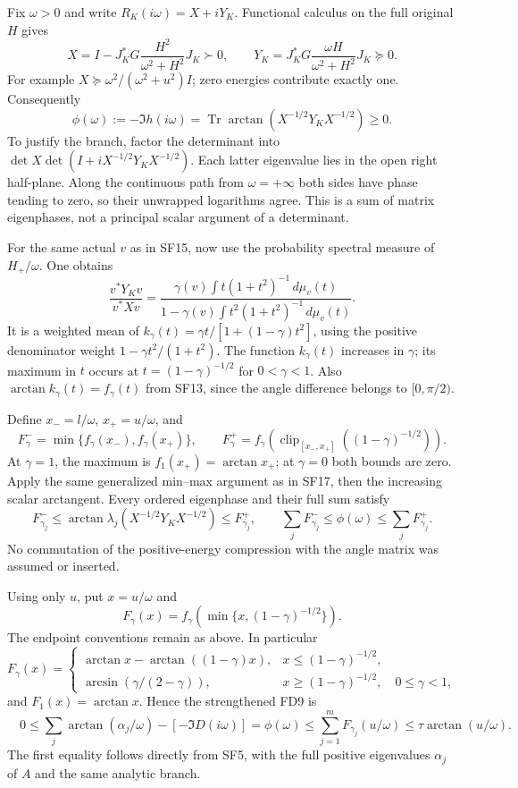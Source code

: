 \documentclass[10pt]{article}
\begin{document}
Fix \(\omega>0\) and write \(R_K(i\omega)=X+iY_K\). Functional calculus on the full original \(H\) gives \[
 X=I-J_K^*G\frac{H^2}{\omega^2+H^2}J_K\succ0,\qquad
 Y_K=J_K^*G\frac{\omega H}{\omega^2+H^2}J_K\succeq0 .
 \tag{SF19}
\] For example \(X\succeq\omega^2/(\omega^2+u^2)I\); zero energies contribute exactly one. Consequently \[
 \phi(\omega):=-\Im h(i\omega)
 =\operatorname{Tr}\arctan(X^{-1/2}Y_KX^{-1/2})\ge0 .
 \tag{SF20}
\] To justify the branch, factor the determinant into \(\det X\det(I+iX^{-1/2}Y_KX^{-1/2})\). Each latter eigenvalue lies in the open right half-plane. Along the continuous path from \(\omega=+\infty\) both sides have phase tending to zero, so their unwrapped logarithms agree. This is a sum of matrix eigenphases, not a principal scalar argument of a determinant.

For the same actual \(v\) as in SF15, now use the probability spectral measure of \(H_+/\omega\). One obtains \[
 \frac{v^*Y_Kv}{v^*Xv}
 =\frac{\gamma(v)\int t(1+t^2)^{-1}\,d\mu_v(t)}
 {1-\gamma(v)\int t^2(1+t^2)^{-1}\,d\mu_v(t)} .
 \tag{SF21}
\] It is a weighted mean of \(k_\gamma(t)=\gamma t/[1+(1-\gamma)t^2]\), using the positive denominator weight \(1-\gamma t^2/(1+t^2)\). The function \(k_\gamma(t)\) increases in \(\gamma\); its maximum in \(t\) occurs at \(t=(1-\gamma)^{-1/2}\) for \(0<\gamma<1\). Also \(\arctan k_\gamma(t)=f_\gamma(t)\) from SF13, since the angle difference belongs to \([0,\pi/2)\).

Define \(x_-=l/\omega\), \(x_+=u/\omega\), and \[
 F_\gamma^-=\min\{f_\gamma(x_-),f_\gamma(x_+)\},\qquad
 F_\gamma^+=f_\gamma\!\left(
 \operatorname{clip}_{[x_-,x_+]}((1-\gamma)^{-1/2})\right).
 \tag{SF22}
\] At \(\gamma=1\), the maximum is \(f_1(x_+)=\arctan x_+\); at \(\gamma=0\) both bounds are zero. Apply the same generalized min--max argument as in SF17, then the increasing scalar arctangent. Every ordered eigenphase and their full sum satisfy \[
 \boxed{\quad
 F_{\gamma_j}^-\le
 \arctan\lambda_j(X^{-1/2}Y_KX^{-1/2})
 \le F_{\gamma_j}^+,\qquad
 \sum_jF_{\gamma_j}^-\le\phi(\omega)\le\sum_jF_{\gamma_j}^+ .
 \quad}
 \tag{SF23}
\] No commutation of the positive-energy compression with the angle matrix was assumed or inserted.

Using only \(u\), put \(x=u/\omega\) and \[
 F_\gamma(x)=
 f_\gamma\!\left(\min\{x,(1-\gamma)^{-1/2}\}\right).
\] The endpoint conventions remain as above. In particular \[
 F_\gamma(x)=
 \begin{cases}
 \arctan x-\arctan((1-\gamma)x),&
 x\le(1-\gamma)^{-1/2},\\
 \arcsin(\gamma/(2-\gamma)),&
 x\ge(1-\gamma)^{-1/2},\quad 0\le\gamma<1,
 \end{cases}
\] and \(F_1(x)=\arctan x\). Hence the strengthened FD9 is \[
 \boxed{\quad
 0\le
 \sum_j\arctan(\alpha_j/\omega)-[-\Im D(i\omega)]
 =\phi(\omega)
 \le\sum_{j=1}^mF_{\gamma_j}(u/\omega)
 \le\tau\arctan(u/\omega).
 \quad}
 \tag{SF24}
\] The first equality follows directly from SF5, with the full positive eigenvalues \(\alpha_j\) of \(A\) and the same analytic branch.
\end{document}
